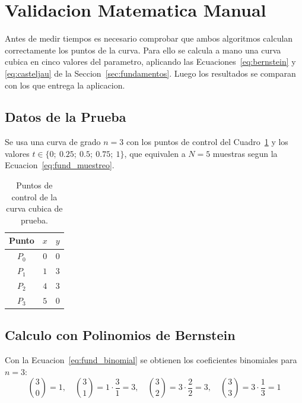 \section{Validacion Matematica Manual}
\label{sec:validacion}

Antes de medir tiempos es necesario comprobar que ambos algoritmos calculan correctamente los puntos de la curva. Para ello se calcula a mano una curva cubica en cinco valores del parametro, aplicando las Ecuaciones~\ref{eq:bernstein} y \ref{eq:casteljau} de la Seccion~\ref{sec:fundamentos}. Luego los resultados se comparan con los que entrega la aplicacion.

\subsection{Datos de la Prueba}
\label{subsec:val_datos}

Se usa una curva de grado $n = 3$ con los puntos de control del Cuadro~\ref{tab:val_puntos} y los valores $t \in \{0;\ 0.25;\ 0.5;\ 0.75;\ 1\}$, que equivalen a $N = 5$ muestras segun la Ecuacion~\ref{eq:fund_muestreo}.

\begin{table}[H]
\centering
\caption{Puntos de control de la curva cubica de prueba.}
\label{tab:val_puntos}
\begin{tabular}{ccc}
\toprule
\textbf{Punto} & \textbf{$x$} & \textbf{$y$} \\
\midrule
$P_0$ & $0$ & $0$ \\
$P_1$ & $1$ & $3$ \\
$P_2$ & $4$ & $3$ \\
$P_3$ & $5$ & $0$ \\
\bottomrule
\end{tabular}
\end{table}

\subsection{Calculo con Polinomios de Bernstein}
\label{subsec:val_bernstein}

Con la Ecuacion~\ref{eq:fund_binomial} se obtienen los coeficientes binomiales para $n = 3$:
\begin{equation}
\label{eq:val_binomiales}
\binom{3}{0} = 1, \quad
\binom{3}{1} = 1 \cdot \frac{3}{1} = 3, \quad
\binom{3}{2} = 3 \cdot \frac{2}{2} = 3, \quad
\binom{3}{3} = 3 \cdot \frac{1}{3} = 1
\end{equation}

